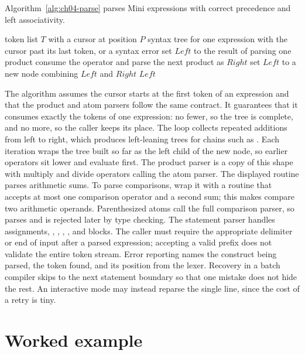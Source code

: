 Algorithm~\ref{alg:ch04-parse} parses Mini expressions with correct precedence and left associativity.
\begin{algorithm}
\caption{Recursive-descent parsing of Mini expressions with layered precedence.}
\label{alg:ch04-parse}
\begin{pseudocode}
\Require token list $T$ with a cursor at position $P$
\Ensure syntax tree for one expression with the cursor past its last token, or a syntax error
\State set $Left$ to the result of parsing one product
\State consume the operator and parse the next product as $Right$
\State set $Left$ to a new node combining $Left$ and $Right$
\EndWhile
\State \Return $Left$
\EndFunction
\end{pseudocode}
\end{algorithm}
The algorithm assumes the cursor starts at the first token of an expression and that the product and atom parsers follow the same contract.
It guarantees that it consumes exactly the tokens of one expression: no fewer, so the tree is complete, and no more, so the caller keeps its place.
The loop collects repeated additions from left to right, which produces left-leaning trees for chains such as .
Each iteration wraps the tree built so far as the left child of the new node, so earlier operators sit lower and evaluate first.
The product parser is a copy of this shape with multiply and divide operators calling the atom parser.
The displayed routine parses arithmetic sums.
To parse comparisons, wrap it with a routine that accepts at most one comparison operator and a second sum; this makes  compare two arithmetic operands.
Parenthesized atoms call the full comparison parser, so  parses and is rejected later by type checking.
The statement parser handles assignments, , , , , and blocks.
The caller must require the appropriate delimiter or end of input after a parsed expression; accepting a valid prefix does not validate the entire token stream.
Error reporting names the construct being parsed, the token found, and its position from the lexer.
Recovery in a batch compiler skips to the next statement boundary so that one mistake does not hide the rest.
An interactive mode may instead reparse the single line, since the cost of a retry is tiny.

\section{Worked example}
\label{sec:ch04-worked-example}

